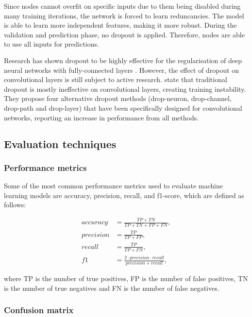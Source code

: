 \documentclass{l4proj}
\begin{document}
Since nodes cannot overfit on specific inputs due to them being disabled during many training iterations, the network is forced to learn reduncancies. The model is able to learn more independent features, making it more robust. During the validation and prediction phase, no dropout is applied. Therefore, nodes are able to use all inputs for predictions.

Research has shown dropout to be highly effective for the regularisation of deep neural networks with fully-connected layers \citep{wu_towards_2015}. However, the effect of dropout on convolutional layers is still subject to active research. \citet{cai_effective_2019} state that traditional dropout is mostly ineffective on convolutional layers, creating training instability. They propose four alternative dropout methods (drop-neuron, drop-channel, drop-path and drop-layer) that have been specifically designed for convolutional networks, reporting an increase in performance from all methods. 

\subsection{Evaluation techniques}

\subsubsection{Performance metrics}

Some of the most common performance metrics used to evaluate machine learning models are accuracy, precision, recall, and f1-score, which are defined as follows:

\begin{align}
  accuracy  &= \frac {TP + TN} {TP + TN + FP + FN}, \\
  precision &= \frac {TP} {TP + FP}, \\
  recall    &= \frac {TP} {TP + FN}, \\
  f1        &= \frac {2 \cdot precision \cdot recall} {precision + recall},
\end{align}

where TP is the number of true positives, FP is the number of false positives, TN is the number of true negatives and FN is the number of false negatives.

\subsubsection{Confusion matrix}
\end{document}
